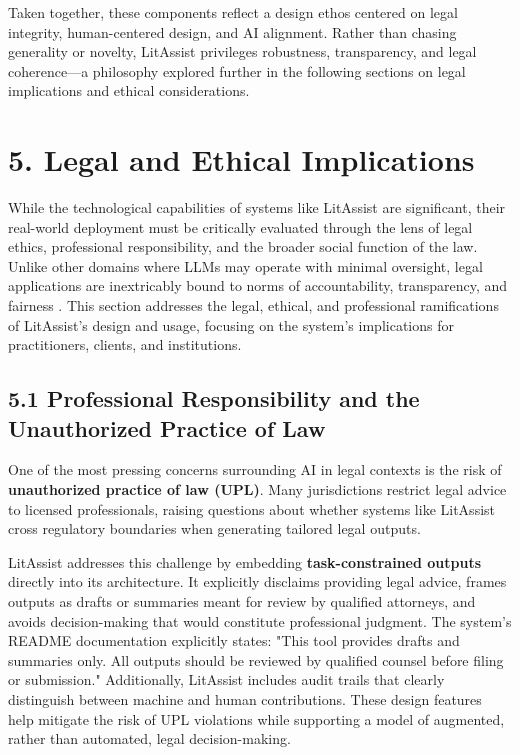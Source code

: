 \documentclass[12pt,a4paper]{article}
\begin{document}
Taken together, these components reflect a design ethos centered on legal integrity, human-centered design, and AI alignment. Rather than chasing generality or novelty, LitAssist privileges robustness, transparency, and legal coherence—a philosophy explored further in the following sections on legal implications and ethical considerations.


\section*{5. Legal and Ethical Implications}

While the technological capabilities of systems like LitAssist are significant, their real-world deployment must be critically evaluated through the lens of legal ethics, professional responsibility, and the broader social function of the law. Unlike other domains where LLMs may operate with minimal oversight, legal applications are inextricably bound to norms of accountability, transparency, and fairness \cite{Binns2018}. This section addresses the legal, ethical, and professional ramifications of LitAssist's design and usage, focusing on the system's implications for practitioners, clients, and institutions.

\subsection*{5.1 Professional Responsibility and the Unauthorized Practice of Law}

One of the most pressing concerns surrounding AI in legal contexts is the risk of \textbf{unauthorized practice of law (UPL)}. Many jurisdictions restrict legal advice to licensed professionals, raising questions about whether systems like LitAssist cross regulatory boundaries when generating tailored legal outputs.

LitAssist addresses this challenge by embedding \textbf{task-constrained outputs} directly into its architecture. It explicitly disclaims providing legal advice, frames outputs as drafts or summaries meant for review by qualified attorneys, and avoids decision-making that would constitute professional judgment. The system's README documentation explicitly states: "This tool provides drafts and summaries only. All outputs should be reviewed by qualified counsel before filing or submission." Additionally, LitAssist includes audit trails that clearly distinguish between machine and human contributions. These design features help mitigate the risk of UPL violations while supporting a model of augmented, rather than automated, legal decision-making.
\end{document}
